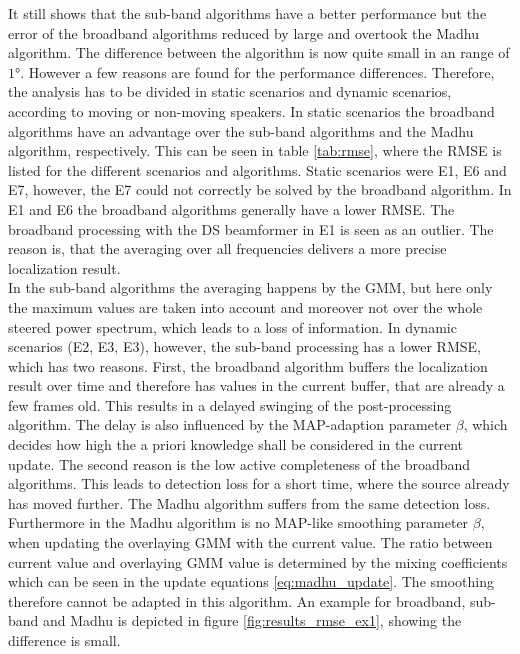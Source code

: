 It still shows that the sub-band algorithms have a better performance but the error of the broadband algorithms reduced by large and overtook the Madhu algorithm. The difference between the algorithm is now quite small in an range of $\ang{1}$. However a few reasons are found for the performance differences. Therefore, the analysis has to be divided in static scenarios and dynamic scenarios, according to moving or non-moving speakers. In static scenarios the broadband algorithms have an advantage over the sub-band algorithms and the Madhu algorithm, respectively. This can be seen in table \ref{tab:rmse}, where the \ac{RMSE} is listed for the different scenarios and algorithms. Static scenarios were E1, E6 and E7, however, the E7 could not correctly be solved by the broadband algorithm. In E1 and E6 the broadband algorithms generally have a lower \ac{RMSE}.
The broadband processing with the \ac{DS} beamformer in E1 is seen as an outlier. The reason is, that the averaging over all frequencies delivers a more precise localization result.\\
In the sub-band algorithms the averaging happens by the \ac{GMM}, but here only the maximum values are taken into account and moreover not over the whole steered power spectrum, which leads to a loss of information. In dynamic scenarios (E2, E3, E3), however, the sub-band processing has a lower \ac{RMSE}, which has two reasons. First, the broadband algorithm buffers the localization result over time and therefore has values in the current buffer, that are already a few frames old. This results in a delayed swinging of the post-processing algorithm. The delay is also influenced by the MAP-adaption parameter $\beta$, which decides how high the a priori knowledge shall be considered in the current update. The second reason is the low active completeness of the broadband algorithms. This leads to detection loss for a short time, where the source already has moved further. The Madhu algorithm suffers from the same detection loss. Furthermore in the Madhu algorithm is no MAP-like smoothing parameter $\beta$, when updating the overlaying GMM with the current value. The ratio between current value and overlaying GMM value is determined by the mixing coefficients which can be seen in the update equations \ref{eq:madhu_update}. The smoothing therefore cannot be adapted in this algorithm. An example for broadband, sub-band and Madhu is depicted in figure \ref{fig:results_rmse_ex1}, showing the difference is small.\\

